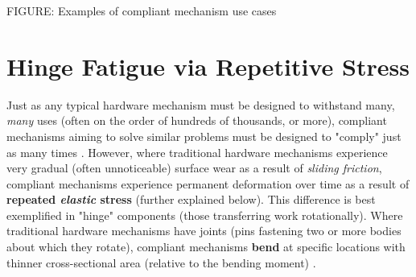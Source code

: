 \documentclass{report}
\begin{document}
FIGURE: Examples of compliant mechanism use cases

\section{Hinge Fatigue via Repetitive Stress}

Just as any typical hardware mechanism must be designed to withstand many, \textit{many} uses (often on the order of hundreds of thousands, or more), compliant mechanisms aiming to solve similar problems 
must be designed to "comply" just as many times \cite{rotationalhinges}. However, where traditional hardware mechanisms experience very gradual (often unnoticeable) surface wear as a result of \textit{sliding friction}, compliant mechanisms experience permanent deformation over time
as a result of \textbf{repeated \textit{elastic} stress} (further explained below). This difference is best exemplified in "hinge" components (those transferring work rotationally). Where traditional hardware mechanisms have joints (pins fastening two or more bodies about which they rotate), 
compliant mechanisms \textbf{bend} at specific locations with thinner cross-sectional area (relative to the bending moment) \cite{compliant}. 
\end{document}
